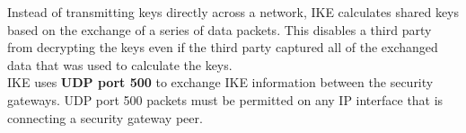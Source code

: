 Instead of transmitting keys directly across a network, IKE calculates shared keys based on the exchange of a series of data packets. This disables a third party from decrypting the keys even if the third party captured all of the exchanged data that was used to calculate the keys.\\

IKE uses \textbf{UDP port 500} to exchange IKE information between the security gateways. UDP port 500 packets must be permitted on any IP interface that is connecting a security gateway peer.


%
%




